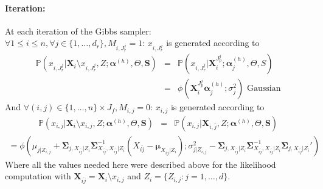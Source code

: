 \documentclass[12pt,a4paper]{report}
\begin{document}
		\paragraph{Iteration:} At each iteration of the Gibbs sampler: \\
			$\forall 1\leq i \leq n, \forall j \in \{1,\dots,d_r \}, M_{i,J_r^j}=1  $:  $x_{i,J_r^j}$ is generated according to 
			\begin{eqnarray}
			\mathbb{P}(x_{i,J_r^j}|\boldsymbol{X}_{i}\setminus x_{i,J_r^j},Z;\boldsymbol{\alpha}^{(h)},\Theta,\boldsymbol{S})&=&
			\mathbb{P}(x_{i,J_r^j}|\boldsymbol{X}_{i}^{J_p^j};\boldsymbol{\alpha}^{(h)}_j,\Theta,{S})\\
			&=&\phi(\boldsymbol{X}_i^{J_p^j}\boldsymbol{\alpha}^{(h)}_{j};\sigma_j^2 ) \textrm{ Gaussian}
			\end{eqnarray}		
			And
			$\forall (i,j) \in \{1,\dots,n \}\times J_f,M_{i,j}=0$:  $x_{i,j}$ is generated according to 
			\begin{eqnarray}
			\mathbb{P}(x_{i,j}|\boldsymbol{X}_{i}\setminus x_{i,j},Z;\boldsymbol{\alpha}^{(h)},\Theta,\boldsymbol{S})&=&\mathbb{P}(x_{i,j}|\boldsymbol{X}_{i,\bar{j}},Z;\boldsymbol{\alpha}^{(h)},\Theta,\boldsymbol{S})			
			\end{eqnarray}			
			\begin{eqnarray}
			=\phi(\mu_{j|Z_{i,j}} + \boldsymbol{\Sigma}_{j,X_{\bar{ij}}|Z_i}\boldsymbol{\Sigma}^{-1}_{X_{\bar{ij}},X_{\bar{ij}}|Z_i}(X_{\bar{ij}}-\boldsymbol{\mu}_{X_{\bar{ij}}|Z_i}) ;  \sigma_{j|Z_{i,j}}^2-\boldsymbol{\Sigma}_{j,X_{\bar{ij}}|Z_i}\boldsymbol{\Sigma}^{-1}_{X_{\bar{ij}},X_{\bar{ij}}|Z_i}\boldsymbol{\Sigma}_{j,X_{\bar{ij}}|Z_i}')
			\end{eqnarray}		
			Where all the values needed here were described above for the likelihood computation with $\boldsymbol{X}_{\bar{ij}}=\boldsymbol{X}_i\setminus x_{i,j}$ and $Z_i=\{Z_{i,j}:j=1,\dots,d \}$.\\
			
\end{document}
